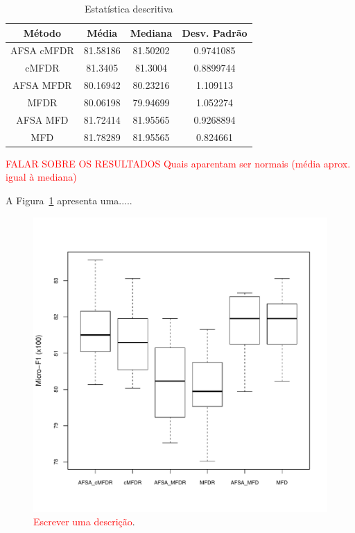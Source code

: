 \documentclass[conference]{IEEEtran}
\begin{document}
\begin{table}[h]
	\centering
	\caption{Estatística descritiva}
	\label{tab:est_descr}
	\begin{tabular}{c|ccc}
		Método    & Média  & Mediana & Desv. Padrão  \\
		\hline
		AFSA cMFDR & 81.58186 	& 81.50202 	& 0.9741085 \\
		cMFDR & 81.3405 	& 81.3004 	& 0.8899744 \\
		AFSA MFDR & 80.16942 	& 80.23216 	& 1.109113 \\
		MFDR & 80.06198 	& 79.94699 	& 1.052274 \\
		AFSA MFD & 81.72414 	& 81.95565 	& 0.9268894 \\
		MFD & 81.78289 	& 81.95565 	& 0.824661 \\
		\hline
	\end{tabular}
\end{table}

\textcolor{red}{FALAR SOBRE OS RESULTADOS
Quais aparentam ser normais (média aprox. igual à mediana)
}


A Figura~\ref{fig:boxplot} apresenta uma.....

\begin{figure}[h]
	\centering
	\includegraphics[width=\linewidth]{img/blueboxplot.pdf}
	\caption{\textcolor{red}{Escrever uma descrição}.}
	\label{fig:boxplot}
\end{figure}
\end{document}
